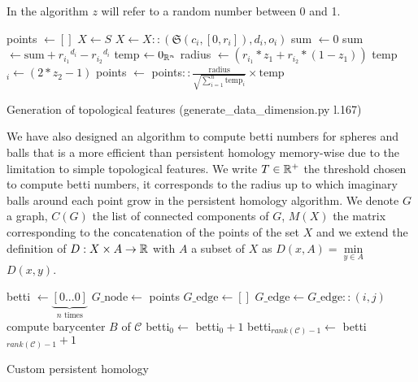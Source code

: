 \documentclass[12pt, a4paper]{article}
\begin{document}
In the algorithm $z$ will refer to a random number between 0 and 1.

\begin{algorithm}[H]
  \begin{algorithmic}[1]
    \STATE points $\gets []$
    \STATE $X \gets S$
    \STATE $X \gets X::(\mathfrak{S}(c_i, [0, r_i]), d_i, o_i)$
    \ENDFOR
    \STATE sum $\gets 0$
    \STATE sum $\gets \text{sum}+ {r_{i_1}}^{d_i} - {r_{i_2}}^{d_i}$
    \ENDFOR
    \STATE temp $\gets 0_{\mathbb{R}^n}$
    \STATE radius $ \gets (r_{i_1} * z_1 + r_{i_2} * (1 - z_1))$
    \STATE temp$_i \gets (2*z_2 - 1)$
    \ENDIF
    \ENDFOR
    \STATE points $\gets$ points$::\frac{\text{radius}}{\sqrt{\sum\limits_{i=1}^n \text{temp}_i}} \times \text{temp}$
    \ENDFOR
    \ENDFOR
    
  \end{algorithmic}
  \caption{Generation of topological features ({\selectfont generate\_data\_dimension.py l.167})}
  \label{alg:topo_gen}
\end{algorithm}

We have also designed an algorithm to compute betti numbers for spheres and balls that is a more efficient than persistent homology memory-wise due to the limitation to simple topological features. We write $T \in \mathbb{R}^+$ the threshold chosen to compute betti numbers, it corresponds to the radius up to which imaginary balls around each point grow in the persistent homology algorithm. We denote $G$ a graph, $C(G)$ the list of connected components of $G$, $M(X)$ the matrix corresponding to the concatenation of the points of the set $X$ and we extend the definition of $D: X \times A \to \mathbb{R}$ with $A$ a subset of $X$ as $D(x,A) = \underset{y \in A}{\min}$ $D(x,y)$.

\begin{algorithm}[H]
  \begin{algorithmic}[1]
    \STATE betti $\gets \underbrace{[0 ... 0]}_{n \text{ times}}$
    \STATE $G\_\text{node} \gets$ points
    \STATE $G\_\text{edge} \gets []$
    \STATE $G\_\text{edge} \gets G\_\text{edge}::(i,j)$
    \ENDIF
    \ENDFOR
    \STATE compute barycenter $B$ of $\mathcal{C}$
    \STATE betti$_0 \gets$ betti$_0 + 1$
    \ELSE
    \STATE betti$_{rank(\mathcal{C}) - 1} \gets$ betti$_{rank(\mathcal{C}) - 1} + 1$
    \ENDIF
    \ENDFOR
  \end{algorithmic}
\caption{Custom persistent homology}
\end{algorithm}
\end{document}
